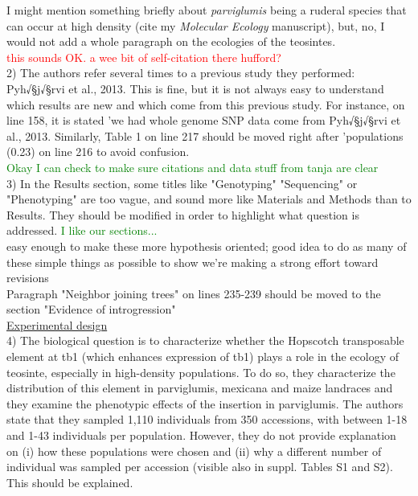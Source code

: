 \documentclass[11pt]{article}
\newcommand{\jri}[1]{\noindent \textcolor{red}{{#1}} \\}
\newcommand{\lev}[1]{\noindent \textcolor{green}{{#1}} \\}
\newcommand{\mbh}[1]{\noindent \textcolor{Dandelion}{{#1}}\\}
\begin{document}
\mbh{I might mention something briefly about \emph{parviglumis} being a ruderal species that can occur at high density (cite my \emph{Molecular Ecology} manuscript), but, no, I would not add a whole paragraph on the ecologies of the teosintes.}
\jri{this sounds OK. a wee bit of self-citation there hufford?}

2) The authors refer several times to a previous study they performed: Pyh√§j√§rvi et al., 2013. This is fine, but it is not always easy to understand which results are new and which come from this previous study. For instance, on line 158, it is stated 'we had whole genome SNP data come from Pyh√§j√§rvi et al., 2013. Similarly, Table 1 on line 217 should be moved right after 'populations (0.23) on line 216 to avoid confusion.\\

\lev{Okay I can check to make sure citations and data stuff from tanja are clear}

3) In the Results section, some titles like "Genotyping" "Sequencing" or "Phenotyping" are too vague, and sound more like Materials and Methods than to Results. They should be modified in order to highlight what question is addressed.
 \lev{I like our sections...}
 \mbh{easy enough to make these more hypothesis oriented; good idea to do as many of these simple things as possible to show we're making a strong effort toward revisions}

Paragraph "Neighbor joining trees" on lines 235-239 should be moved to the section "Evidence of introgression"\\

\underline{Experimental design}\\

4) The biological question is to characterize whether the Hopscotch transposable element at tb1 (which enhances expression of tb1) plays a role in the ecology of teosinte, especially in high-density populations. To do so, they characterize the distribution of this element in parviglumis, mexicana and maize landraces and they examine the phenotypic effects of the insertion in parviglumis.
The authors state that they sampled 1,110 individuals from 350 accessions, with between 1-18 and 1-43 individuals per population. However, they do not provide explanation on (i) how these populations were chosen and (ii) why a different number of individual was sampled per accession (visible also in suppl. Tables S1 and S2). This should be explained.\\
\end{document}
